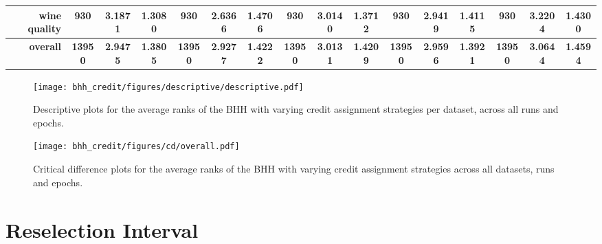 \begin{table}[htbp]
{\begin{tabular}{rccccccccccccccc}
			wine quality                        & 930                                 & 3.1871                                                                    & 1.3080          & 930                                & \cellcolor[rgb]{ .776,  .937,  .808}\textcolor[rgb]{ 0,  .38,  0}{2.6366}          & 1.4706          & 930                                & 3.0140                                                                    & 1.3712          & 930                                & 2.9419                                                                    & 1.4115          & 930                                    & 3.2204                                                                    & 1.4300          \\
			\midrule
			\textbf{overall}                    & \textbf{13950}                      & \textbf{2.9475}                                                           & \textbf{1.3805} & \textbf{13950}                     & \cellcolor[rgb]{ .776,  .937,  .808}\textcolor[rgb]{ 0,  .38,  0}{\textbf{2.9277}} & \textbf{1.4222} & \textbf{13950}                     & \textbf{3.0131}                                                           & \textbf{1.4209} & \textbf{13950}                     & \textbf{2.9596}                                                           & \textbf{1.3921} & \textbf{13950}                         & \textbf{3.0644}                                                           & \textbf{1.4594} \\
		\end{tabular}%
	}
\end{table}%

\begin{figure}[htbp]
	\centering
	\texttt{[image: bhh\_credit/figures/descriptive/descriptive.pdf]}
	\caption{Descriptive plots for the average ranks of the \acs{BHH} with varying credit assignment strategies per dataset, across all runs and epochs.}
	\label{fig:results:credit:descriptive:descriptive}
\end{figure}

\begin{figure}[htbp]
	\centering
	\texttt{[image: bhh\_credit/figures/cd/overall.pdf]}
	\caption{Critical difference plots for the average ranks of the \acs{BHH} with varying credit assignment strategies across all datasets, runs and epochs.}
	\label{fig:results:credit:descriptive:cd}
\end{figure}

\section{Reselection Interval}\label{sec:results:bhh_variant_reselection}

